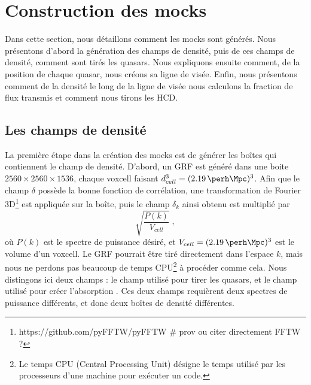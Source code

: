 \documentclass[11pt, twoside, a4paper, openright]{report}
\begin{document}
\section{Construction des mocks}
Dans cette section, nous détaillons comment les mocks sont générés. Nous présentons d'abord la génération des champs de densité, puis de ces champs de densité, comment sont tirés les quasars. Nous expliquons ensuite comment, de la position de chaque quasar, nous créons sa ligne de visée. Enfin, nous présentons comment de la densité le long de la ligne de visée nous calculons la fraction de flux transmis et comment nous tirons les HCD.


\subsection{Les champs de densité}
\label{subsec:densityfields}
La première étape dans la création des mocks est de générer les boîtes qui contiennent le champ de densité. D'abord, un GRF est généré dans une boite $\num{2560}\times\num{2560}\times\num{1536}$, chaque voxcell faisant  $d_{cell}^3 = (\SI{2.19}{\perh\Mpc})^3$.
Afin que le champ $\delta$ possède la bonne fonction de corrélation, une transformation de Fourier 3D\footnote{https://github.com/pyFFTW/pyFFTW \# prov ou citer directement FFTW ?} est appliquée sur la boîte, puis le champ $\delta_k$ ainsi obtenu est multiplié par
\begin{equation}
  \sqrt{\frac{P(k)}{V_{cell}}} \; ,
\end{equation}
où $P(k)$ est le spectre de puissance désiré, et $V_{cell} = (\SI{2.19}{\perh\Mpc})^3$ est le volume d'un voxcell.
Le GRF pourrait être tiré directement dans l'espace $k$, mais nous ne perdons pas beaucoup de temps CPU\footnote{Le temps CPU (Central Processing Unit) désigne le temps utilisé par les processeurs d'une machine pour exécuter un code.} à procéder comme cela.
Nous distingons ici deux champs : le champ utilisé pour tirer les quasars, et le champ utilisé pour créer l'absorption \lya{}. Ces deux champs requièrent deux spectres de puissance différents, et donc deux boîtes de densité différentes.
\end{document}
